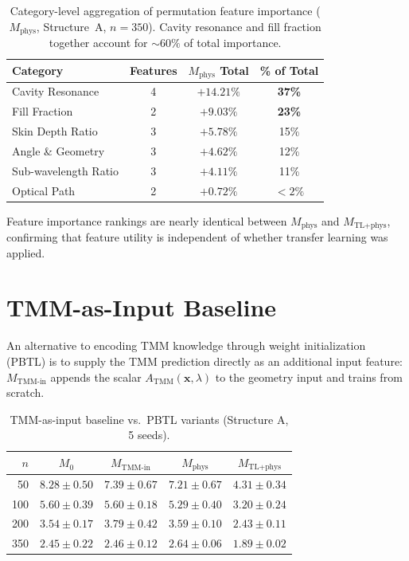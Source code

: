 \documentclass[11pt]{article}
\newcommand{\Mzero}{\ensuremath{M_0}}
\newcommand{\Mphys}{\ensuremath{M_\text{phys}}}
\newcommand{\Mtlphys}{\ensuremath{M_\text{TL+phys}}}
\begin{document}
\begin{table}[htbp]\centering\small
\caption{Category-level aggregation of permutation feature importance ($\Mphys$, Structure~A, $n=350$). Cavity resonance and fill fraction together account for ${\sim}60\%$ of total importance.}
\label{tab:category_importance}
\begin{tabular}{lccc}\toprule
\textbf{Category} & \textbf{Features} & $\Mphys$ \textbf{Total} & \textbf{\% of Total}\\\midrule
Cavity Resonance     & 4 & $+14.21\%$ & \textbf{37\%}\\
Fill Fraction        & 2 & $+9.03\%$  & \textbf{23\%}\\
Skin Depth Ratio     & 3 & $+5.78\%$  & 15\%\\
Angle \& Geometry    & 3 & $+4.62\%$  & 12\%\\
Sub-wavelength Ratio & 3 & $+4.11\%$  & 11\%\\
Optical Path         & 2 & $+0.72\%$  & $<2\%$\\\bottomrule
\end{tabular}
\end{table}

Feature importance rankings are nearly identical between $\Mphys$ and $\Mtlphys$, confirming that feature utility is independent of whether transfer learning was applied.


\section{TMM-as-Input Baseline}
\label{sec:si_tmm_input}

An alternative to encoding TMM knowledge through weight initialization (PBTL) is to supply the TMM prediction directly as an additional input feature: $M_\text{TMM-in}$ appends the scalar $A_\text{TMM}(\mathbf{x}, \lambda)$ to the geometry input and trains from scratch.

\begin{table}[htbp]\centering\small
\caption{TMM-as-input baseline vs.\ PBTL variants (Structure A, 5 seeds).}
\label{tab:tmm_input}
\begin{tabular}{r cccc}\toprule
$n$ & $\Mzero$ & $M_\text{TMM-in}$ & $\Mphys$ & $\Mtlphys$\\\midrule
50  & $8.28 \pm 0.50$ & $7.39 \pm 0.67$ & $7.21 \pm 0.67$  & $\mathbf{4.31 \pm 0.34}$\\
100 & $5.60 \pm 0.39$ & $5.60 \pm 0.18$ & $5.29 \pm 0.40$  & $\mathbf{3.20 \pm 0.24}$\\
200 & $3.54 \pm 0.17$ & $3.79 \pm 0.42$ & $3.59 \pm 0.10$  & $\mathbf{2.43 \pm 0.11}$\\
350 & $2.45 \pm 0.22$ & $2.46 \pm 0.12$ & $2.64 \pm 0.06$  & $\mathbf{1.89 \pm 0.02}$\\\bottomrule
\end{tabular}
\end{table}
\end{document}
